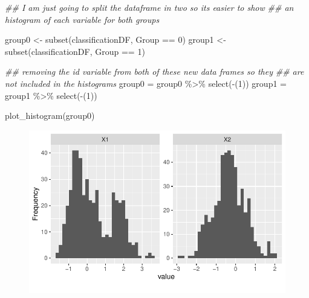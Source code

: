 \documentclass[
  letterpaper,
  DIV=11,
  numbers=noendperiod]{scrartcl}
\newenvironment{Shaded}{\begin{snugshade}}{\end{snugshade}}
\newcommand{\DecValTok}[1]{\textcolor[rgb]{0.68,0.00,0.00}{#1}}
\newcommand{\DocumentationTok}[1]{\textcolor[rgb]{0.37,0.37,0.37}{\textit{#1}}}
\newcommand{\FunctionTok}[1]{\textcolor[rgb]{0.28,0.35,0.67}{#1}}
\newcommand{\NormalTok}[1]{\textcolor[rgb]{0.00,0.23,0.31}{#1}}
\newcommand{\OtherTok}[1]{\textcolor[rgb]{0.00,0.23,0.31}{#1}}
\newcommand{\SpecialCharTok}[1]{\textcolor[rgb]{0.37,0.37,0.37}{#1}}
\begin{document}
\begin{Shaded}
\begin{Highlighting}[]
\DocumentationTok{\#\# I am just going to split the dataframe in two so its easier to show}
\DocumentationTok{\#\# an histogram of each variable for both groups}

\NormalTok{group0 }\OtherTok{\textless{}{-}} \FunctionTok{subset}\NormalTok{(classificationDF, Group }\SpecialCharTok{==} \DecValTok{0}\NormalTok{)}
\NormalTok{group1 }\OtherTok{\textless{}{-}} \FunctionTok{subset}\NormalTok{(classificationDF, Group }\SpecialCharTok{==} \DecValTok{1}\NormalTok{)}

\DocumentationTok{\#\# removing the id variable from both of these new data frames so they}
\DocumentationTok{\#\# are not included in the histograms}
\NormalTok{group0 }\OtherTok{=}\NormalTok{ group0 }\SpecialCharTok{\%\textgreater{}\%}
    \FunctionTok{select}\NormalTok{(}\SpecialCharTok{{-}}\NormalTok{(}\DecValTok{1}\NormalTok{))}
\NormalTok{group1 }\OtherTok{=}\NormalTok{ group1 }\SpecialCharTok{\%\textgreater{}\%}
    \FunctionTok{select}\NormalTok{(}\SpecialCharTok{{-}}\NormalTok{(}\DecValTok{1}\NormalTok{))}


\FunctionTok{plot\_histogram}\NormalTok{(group0)}
\end{Highlighting}
\end{Shaded}

\begin{figure}[H]

{\centering \includegraphics{AssignmentAdvancedTopicsInStatistics_files/figure-pdf/unnamed-chunk-16-1.pdf}

}

\end{figure}
\end{document}
